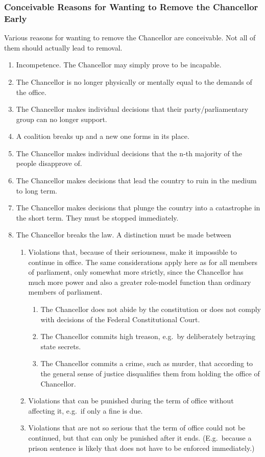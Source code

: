\subsubsection{Conceivable Reasons for Wanting to Remove the Chancellor Early}

Various reasons for wanting to remove the Chancellor are conceivable.
Not all of them should actually lead to removal.

\begin{enumerate}
    \item Incompetence. The Chancellor may simply prove to be incapable.
    \item The Chancellor is no longer physically or mentally equal to the demands of the office.
    \item The Chancellor makes individual decisions that their party/parliamentary group can no longer support.
    \item A coalition breaks up and a new one forms in its place.
    \item The Chancellor makes individual decisions that the n-th majority of the people disapprove of.
    \item The Chancellor makes decisions that lead the country to ruin in the medium to long term.
    \item The Chancellor makes decisions that plunge the country into a catastrophe in the short term. They must be stopped immediately.
    \item The Chancellor breaks the law.
        A distinction must be made between
        \begin{enumerate}
          \item Violations that, because of their seriousness, make it impossible to continue in office. The same considerations apply here as for all members of parliament, only somewhat more strictly, since the Chancellor has much more power and also a greater role-model function than ordinary members of parliament.
            \begin{enumerate}
                \item The Chancellor does not abide by the constitution or does not comply with decisions of the Federal Constitutional Court.
                \item The Chancellor commits high treason, e.g.\ by deliberately betraying state secrets.
                \item The Chancellor commits a crime, such as murder, that according to the general sense of justice disqualifies them from holding the office of Chancellor.
            \end{enumerate}
          \item Violations that can be punished during the term of office without affecting it, e.g.\ if only a fine is due.
          \item Violations that are not so serious that the term of office could not be continued, but that can only be punished after it ends. (E.g.\ because a prison sentence is likely that does not have to be enforced immediately.)
        \end{enumerate}


\end{enumerate}
